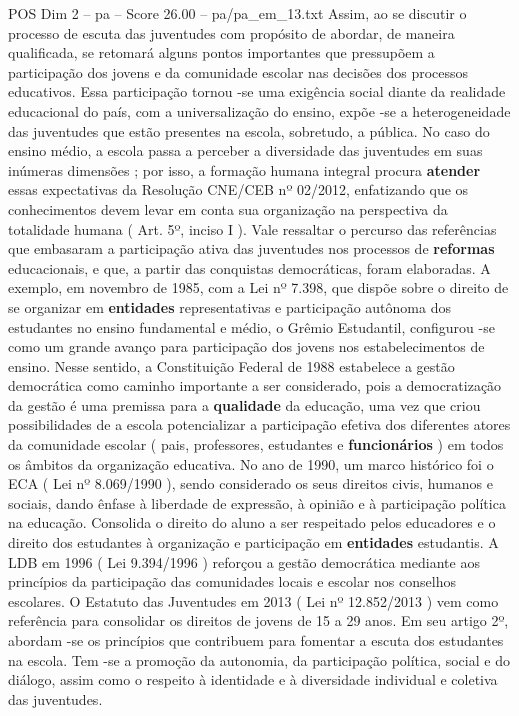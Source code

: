 \begin{textsample}{POS Dim 2 – pa – Score 26.00 – pa/pa\_em\_13.txt}
Assim, ao se discutir o processo de escuta das juventudes com propósito de abordar, de maneira qualificada, se retomará alguns pontos importantes que pressupõem a participação dos jovens e da comunidade escolar nas decisões dos processos educativos.
Essa participação tornou -se uma exigência social diante da realidade educacional do país, com a universalização do ensino, expõe -se a heterogeneidade das juventudes que estão presentes na escola, sobretudo, a pública.
No caso do ensino médio, a escola passa a perceber a diversidade das juventudes em suas inúmeras dimensões ; por isso, a formação humana integral procura \textbf{atender} essas expectativas da Resolução CNE/CEB nº 02/2012, enfatizando que os conhecimentos devem levar em conta sua organização na perspectiva da totalidade humana ( Art. 5º, inciso I ).
Vale ressaltar o percurso das referências que embasaram a participação ativa das juventudes nos processos de \textbf{reformas} educacionais, e que, a partir das conquistas democráticas, foram elaboradas.
A exemplo, em novembro de 1985, com a Lei nº 7.398, que dispõe sobre o direito de se organizar em \textbf{entidades} representativas e participação autônoma dos estudantes no ensino fundamental e médio, o Grêmio Estudantil, configurou -se como um grande avanço para participação dos jovens nos estabelecimentos de ensino.
Nesse sentido, a Constituição Federal de 1988 estabelece a gestão democrática como caminho importante a ser considerado, pois a democratização da gestão é uma premissa para a \textbf{qualidade} da educação, uma vez que criou possibilidades de a escola potencializar a participação efetiva dos diferentes atores da comunidade escolar ( pais, professores, estudantes e \textbf{funcionários} ) em todos os âmbitos da organização educativa.
No ano de 1990, um marco histórico foi o ECA ( Lei nº 8.069/1990 ), sendo considerado os seus direitos civis, humanos e sociais, dando ênfase à liberdade de expressão, à opinião e à participação política na educação.
Consolida o direito do aluno a ser respeitado pelos educadores e o direito dos estudantes à organização e participação em \textbf{entidades} estudantis.
A LDB em 1996 ( Lei 9.394/1996 ) reforçou a gestão democrática mediante aos princípios da participação das comunidades locais e escolar nos conselhos escolares.
O Estatuto das Juventudes em 2013 ( Lei nº 12.852/2013 ) vem como referência para consolidar os direitos de jovens de 15 a 29 anos.
Em seu artigo 2º, abordam -se os princípios que contribuem para fomentar a escuta dos estudantes na escola.
Tem -se a promoção da autonomia, da participação política, social e do diálogo, assim como o respeito à identidade e à diversidade individual e coletiva das juventudes.

\end{textsample}
